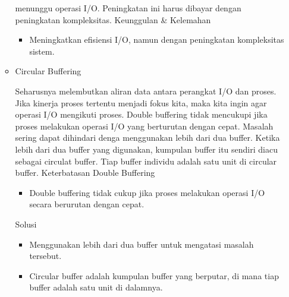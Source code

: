 \documentclass[12pt]{article}
\begin{document}
\begin{itemize}
\begin{itemize}
    menunggu operasi I/O. Peningkatan ini harus dibayar dengan peningkatan kompleksitas.
    \newline Keunggulan & Kelemahan 
    \begin{itemize}
        \item  Meningkatkan efisiensi I/O, namun
        dengan peningkatan kompleksitas
        sistem.
    \end{itemize}
    \item Circular Buffering
    \par  Seharusnya melembutkan aliran data antara perangkat I/O dan proses. Jika kinerja
 proses tertentu menjadi fokus kita, maka kita ingin agar operasi I/O mengikuti proses.
 Double buffering tidak mencukupi jika proses melakukan operasi I/O yang berturutan
 dengan cepat. Masalah sering dapat dihindari denga menggunakan lebih dari dua buffer.
 Ketika lebih dari dua buffer yang digunakan, kumpulan buffer itu sendiri diacu sebagai
 circulat buffer. Tiap buffer individu adalah satu unit di circular buffer.
\newline
\newline Keterbatasan Double Buffering 
\begin{itemize}
\item  Double buffering tidak cukup jika
proses melakukan operasi I/O secara
berurutan dengan cepat.
\end{itemize}
\newline Solusi
\begin{itemize}
\newline  
\item Menggunakan lebih dari dua buffer untuk
mengatasi masalah tersebut.
\item Circular buffer adalah kumpulan buffer
yang berputar, di mana tiap buffer adalah
satu unit di dalamnya.
    
    
\end{itemize}
\end{itemize}

\end{itemize}
\end{document}
